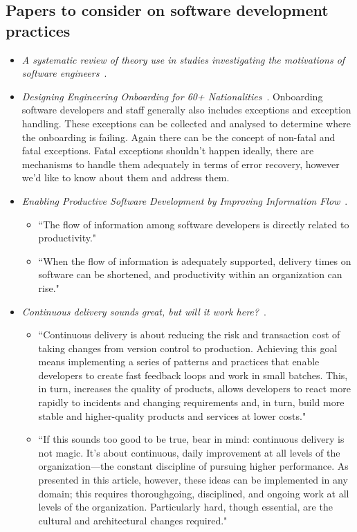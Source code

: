 \subsection{Papers to consider on software development practices}
\begin{itemize}
    \item \emph{A systematic review of theory use in studies investigating the motivations of software engineers}~\citep{hall2009systematic}.
    \item \emph{Designing Engineering Onboarding for 60+ Nationalities}~\citep{harty2020_designing_engineering_onboarding}. Onboarding software developers and staff generally also includes exceptions and exception handling. These exceptions can be collected and analysed to determine where the onboarding is failing. Again there can be the concept of non-fatal and fatal exceptions. Fatal exceptions shouldn't happen ideally, there are mechanisms to handle them adequately in terms of error recovery, however we'd like to know about them and address them.
    \item \emph{Enabling Productive Software Development by Improving Information Flow}~\citep{murphy_enabling_2019}. 
    \begin{itemize}
        \item ``The flow of information among software developers is directly related to productivity."
        \item ``When the flow of information is adequately supported, delivery times on software can be shortened, and productivity within an organization can rise."
    \end{itemize}
    \item \emph{Continuous delivery sounds great, but will it work here?}~\citep{humble2018_continuous_delivery_sounds_great}. 
    \begin{itemize}
        \item ``Continuous delivery is about reducing the risk and transaction cost of taking changes from version control to production. Achieving this goal means implementing a series of patterns and practices that enable developers to create fast feedback loops and work in small batches. This, in turn, increases the quality of products, allows developers to react more rapidly to incidents and changing requirements and, in turn, build more stable and higher-quality products and services at lower costs."
        \item ``If this sounds too good to be true, bear in mind: continuous delivery is not magic. It's about continuous, daily improvement at all levels of the organization—the constant discipline of pursuing higher performance. As presented in this article, however, these ideas can be implemented in any domain; this requires thoroughgoing, disciplined, and ongoing work at all levels of the organization. Particularly hard, though essential, are the cultural and architectural changes required."
    \end{itemize}
    
\end{itemize}


